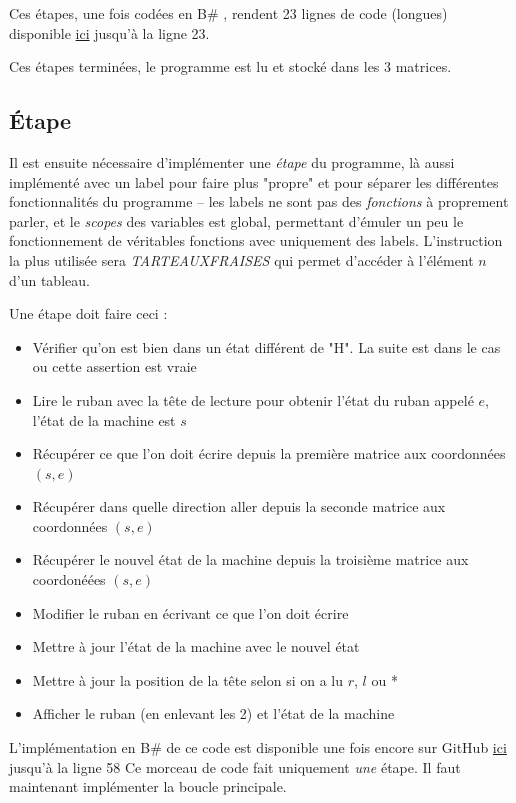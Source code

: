 \documentclass[11pt,colorlinks=true,a4paper]{article}
\newcommand{\bs}{B\# }
\begin{document}
    Ces étapes, une fois codées en \bs , rendent 23 lignes de code (longues) disponible \href{https://github.com/coco33920/ocaml-baguettesharp-interpreter/blob/master/examples/turing.baguette#L3}{ici} 
    jusqu'à la ligne 23.\par 
    \bigskip 
    Ces étapes terminées, le programme est lu et stocké dans les 3 matrices.

    \subsection{Étape}
    Il est ensuite nécessaire d'implémenter une \textit{étape} du programme, là aussi implémenté avec un label pour faire plus "propre" et pour séparer 
    les différentes fonctionnalités du programme -- les labels ne sont pas des \textit{fonctions} à proprement parler, et  le \textit{scopes} des variables 
    est global, permettant d'émuler un peu le fonctionnement de véritables fonctions avec uniquement des labels. L'instruction la plus utilisée sera 
    \textit{TARTEAUXFRAISES} qui permet d'accéder à l'élément $n$ d'un tableau.\par 
    \bigskip 
    Une étape doit faire ceci : 
    \begin{itemize}
        \item Vérifier qu'on est bien dans un état différent de "H". La suite est dans le cas ou cette assertion est vraie
        \item Lire le ruban avec la tête de lecture pour obtenir l'état du ruban appelé $e$, l'état de la machine est $s$ 
        \item Récupérer ce que l'on doit écrire depuis la première matrice aux coordonnées $(s,e)$
        \item Récupérer dans quelle direction aller depuis la seconde matrice aux coordonnées $(s,e)$
        \item Récupérer le nouvel état de la machine depuis la troisième matrice aux coordonéées $(s,e)$
        \item Modifier le ruban en écrivant ce que l'on doit écrire 
        \item Mettre à jour l'état de la machine avec le nouvel état 
        \item Mettre à jour la position de la tête selon si on a lu $r$, $l$ ou * 
        \item Afficher le ruban (en enlevant les 2) et l'état de la machine
    \end{itemize} 
    L'implémentation en \bs de ce code est disponible une fois encore sur GitHub \href{https://github.com/coco33920/ocaml-baguettesharp-interpreter/blob/master/examples/turing.baguette#L26}{ici} jusqu'à la ligne 58
    Ce morceau de code fait uniquement \textit{une} étape. Il faut maintenant implémenter la boucle principale.
\end{document}
